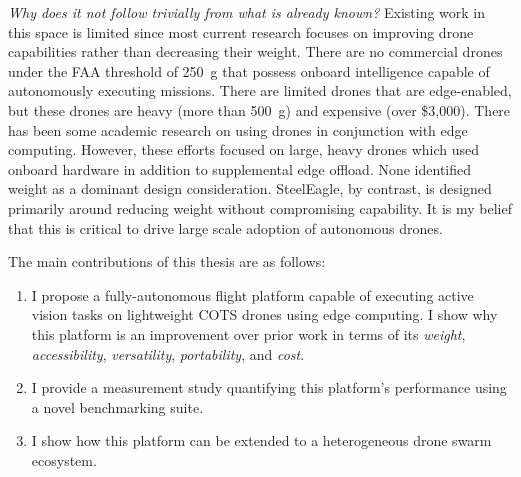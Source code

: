 \textit{Why does it not follow trivially from what is already known?} Existing work in this space is limited since most current research focuses on improving drone capabilities rather than decreasing their weight. There are no commercial drones under the FAA threshold of 250~g that possess onboard intelligence capable of autonomously executing  missions. There are limited drones that are edge-enabled, but these drones are heavy (more than 500~g) and expensive (over \$3,000).
There has been some academic research on using drones in conjunction with edge computing. However, these efforts focused on large, heavy drones which used onboard hardware in addition to supplemental edge offload. None identified weight as a dominant design consideration. SteelEagle, by contrast, is designed primarily around reducing weight without compromising capability. It is my belief that this is critical to drive large scale adoption of autonomous drones. 

\begin{flushleft}
The main contributions of this thesis are as follows:
\end{flushleft}
\begin{enumerate}
\item I propose a fully-autonomous flight platform capable of executing active vision tasks on lightweight COTS drones using edge computing. I show why this platform is an improvement over prior work in terms of its \textit{weight}, \textit{accessibility}, \textit{versatility}, \textit{portability}, and \textit{cost}.
\item I provide a measurement study quantifying this platform's performance using a novel benchmarking suite.
\item I show how this platform can be extended to a heterogeneous drone swarm ecosystem.  
\end{enumerate}

 

